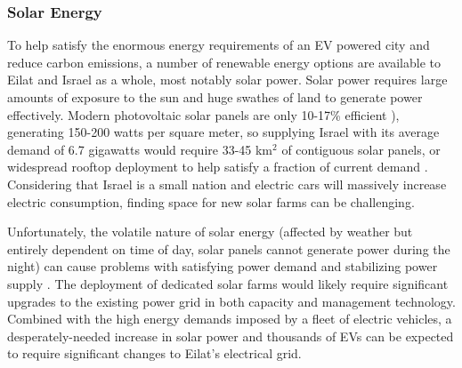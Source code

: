 \documentclass[12pt]{article}                         %
\begin{document}
\subsubsection{Solar Energy}
To help satisfy the enormous energy requirements of an EV powered city and reduce carbon emissions, a number of renewable energy options are available to Eilat and Israel as a whole, most notably solar power. Solar power requires large amounts of exposure to the sun and huge swathes of land to generate power effectively. Modern photovoltaic solar panels are only 10-17\% efficient \cite{Zhu2015DistributedGrid}), generating 150-200 watts per square meter, so supplying Israel with its average demand of 6.7 gigawatts would require 33-45 km$^2$ of contiguous solar panels, or widespread rooftop deployment to help satisfy a fraction of current demand \cite{Vardimon2011AssessmentIsrael}. Considering that Israel is a small nation and electric cars will massively increase electric consumption, finding space for new solar farms can be challenging.

Unfortunately, the volatile nature of solar energy (affected by weather but entirely dependent on time of day, solar panels cannot generate power during the night) can cause problems with satisfying power demand and stabilizing power supply \cite{Lu2015IntroductionPEVs}. The deployment of dedicated solar farms would likely require significant upgrades to the existing power grid \cite{Vardimon2011AssessmentIsrael} in both capacity and management technology. Combined with the high energy demands imposed by a fleet of electric vehicles, a desperately-needed increase in solar power and thousands of EVs can be expected to require significant changes to Eilat's electrical grid.
\end{document}
